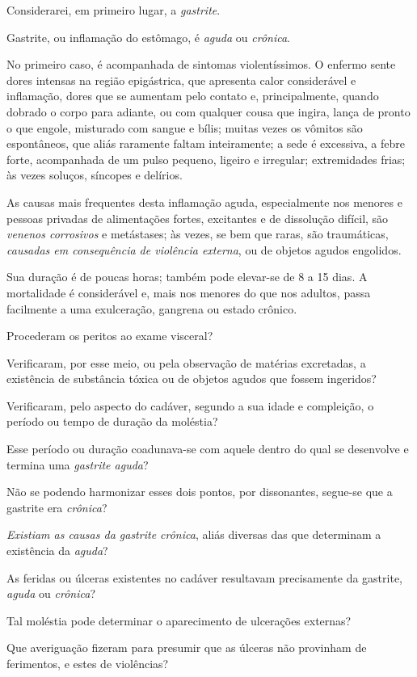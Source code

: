 {Considerarei, em primeiro lugar, a \emph{gastrite}.

Gastrite, ou inflamação do estômago, é \emph{aguda} ou \emph{crônica}.

No primeiro caso, é acompanhada de sintomas violentíssimos. O enfermo
sente dores intensas na região epigástrica, que apresenta calor
considerável e inflamação, dores que se aumentam pelo contato e,
principalmente, quando dobrado o corpo para adiante, ou com qualquer
cousa que ingira, lança de pronto o que engole, misturado com sangue e
bílis; muitas vezes os vômitos são espontâneos, que aliás raramente
faltam inteiramente; a sede é excessiva, a febre forte, acompanhada de
um pulso pequeno, ligeiro e irregular; extremidades frias; às vezes
soluços, síncopes e delírios.

As causas mais frequentes desta inflamação aguda, especialmente nos
menores e pessoas privadas de alimentações fortes, excitantes e de
dissolução difícil, são \emph{venenos corrosivos} e metástases; às
vezes, se bem que raras, são traumáticas, \emph{causadas em consequência
de violência externa}, ou de objetos agudos engolidos.

Sua duração é de poucas horas; também pode elevar-se de 8 a 15 dias. A
mortalidade é considerável e, mais nos menores do que nos adultos, passa
facilmente a uma exulceração, gangrena ou estado crônico.

Procederam os peritos ao exame visceral?

Verificaram, por esse meio, ou pela observação de matérias excretadas, a
existência de substância tóxica ou de objetos agudos que fossem
ingeridos?

Verificaram, pelo aspecto do cadáver, segundo a sua idade e compleição,
o período ou tempo de duração da moléstia?

Esse período ou duração coadunava-se com aquele dentro do qual se
desenvolve e termina uma \emph{gastrite aguda}?

Não se podendo harmonizar esses dois pontos, por dissonantes, segue-se
que a gastrite era \emph{crônica}?

\emph{Existiam as causas da gastrite crônica}, aliás diversas das que
determinam a existência da \emph{aguda}?

As feridas ou úlceras existentes no cadáver resultavam precisamente da
gastrite, \emph{aguda} ou \emph{crônica}?

Tal moléstia pode determinar o aparecimento de ulcerações externas?

Que averiguação fizeram para presumir que as úlceras não provinham de
ferimentos, e estes de violências?

}
